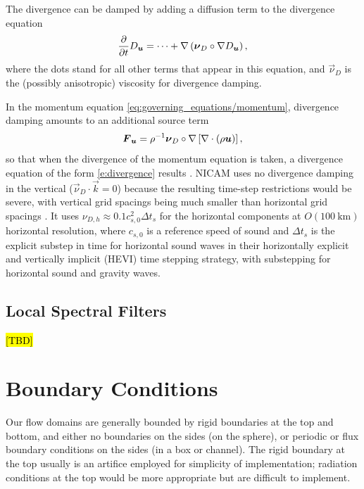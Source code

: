 \documentclass{report}
\begin{document}
The divergence can be damped by adding a diffusion term to the divergence equation
\begin{equation}\label{e:divergence}
\frac{\partial}{\partial t} D_{\boldsymbol{{u}}}  = \cdots + \nabla \left( \boldsymbol{{\nu}}_D \circ \nabla D_{\boldsymbol{{u}}} \right),
\end{equation}
where the dots stand for all other terms that appear in this equation, and $\vec{\nu}_D$ is the (possibly anisotropic) viscosity for divergence damping.

In the momentum equation \eqref{eq:governing_equations/momentum}, divergence damping amounts to an additional source term
\begin{equation}
\boldsymbol{{F}}_{\boldsymbol{{u}}} = \rho^{-1} \boldsymbol{{\nu}}_D \circ \nabla\left[\nabla \cdot (\rho \boldsymbol{{u}}) \right],
\end{equation}
so that when the divergence of the momentum equation is taken, a divergence equation of the form \eqref{e:divergence} results \citep[cf.][]{Jablonowksi11a}. NICAM uses no divergence damping in the vertical ($\vec{\nu}_D \cdot \vec{k}=0$) because the resulting time-step restrictions would be severe, with vertical grid spacings being much smaller than horizontal grid spacings \citep{tomita:2004}. It uses $\nu_{D, h} \approx 0.1 c_{s, 0}^2 \Delta t_s$ for the horizontal components at $O(100~\mathrm{km})$ horizontal resolution, where $c_{s,0}$ is a reference speed of sound and $\Delta t_s$ is the explicit substep in time for horizontal sound waves in their horizontally explicit and vertically implicit (HEVI) time stepping strategy, with substepping for horizontal sound and gravity waves. 

\section{Local Spectral Filters}

\hl{[TBD]}

\chapter{Boundary Conditions}\label{sct:bc}

Our flow domains are generally bounded by rigid boundaries at the top and bottom, and either no boundaries on the sides (on the sphere), or periodic or flux boundary conditions on the sides (in a box or channel). The rigid boundary at the top usually is an artifice employed for simplicity of implementation; radiation conditions at the top would be more appropriate but are difficult to implement. 
\end{document}
